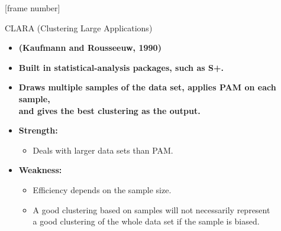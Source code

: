 \documentclass[aspectratio=169,t,xcolor=dvipsnames]{beamer}
\begin{document}
  { %
    [frame number]
    \begin{frame}{CLARA (Clustering Large Applications)}
      \begin{itemize}
        \item \textbf{(Kaufmann and Rousseeuw, 1990)}
        \item \textbf{Built in statistical-analysis packages, such as S+.}
        \item \textbf{Draws multiple samples of the data set, applies PAM on each sample,\\
         and gives the best clustering as the output.}
        \item \textbf{Strength:}
        \begin{itemize}
          \item Deals with larger data sets than PAM.
        \end{itemize}
        \item \textbf{Weakness:}
        \begin{itemize}
          \item Efficiency depends on the sample size.
          \item A good clustering based on samples will not necessarily represent \\
          a good clustering of the whole data set if the sample is biased.
        \end{itemize}
      \end{itemize}
    \end{frame}
  }
\end{document}
